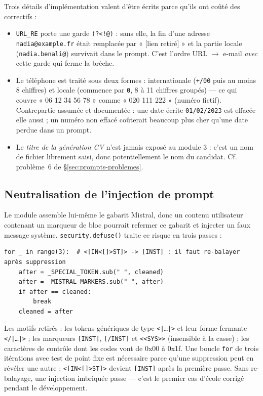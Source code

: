 Trois détails d'implémentation valent d'être écrits parce qu'ils ont coûté des
correctifs :

\begin{itemize}[itemsep=2pt]
  \item \texttt{URL\_RE} porte une garde \texttt{(?<!@)} : sans elle, la fin
        d'une adresse \texttt{nadia@example.fr} était remplacée par « [lien
        retiré] » et la partie locale (\texttt{nadia.benali@}) survivait dans le
        prompt. C'est l'ordre URL $\to$ e-mail \emph{avec} cette garde qui ferme
        la brèche.
  \item Le téléphone est traité sous deux formes : internationale
        (\texttt{+/00} puis au moins 8 chiffres) et locale (commence par
        \texttt{0}, 8 à 11 chiffres groupés) --- ce qui couvre « 06 12 34 56 78 »
        comme « 020 111 222 » (numéro fictif). Contrepartie assumée et documentée
        : une date
        écrite \texttt{01/02/2023} est effacée elle aussi ; un numéro non effacé
        coûterait beaucoup plus cher qu'une date perdue dans un prompt.
  \item Le \emph{titre de la génération CV} n'est jamais exposé au module 3 :
        c'est un nom de fichier librement saisi, donc potentiellement le nom du
        candidat. Cf. problème~6 de §\ref{sec:prompts-problemes}.
\end{itemize}

\subsection{Neutralisation de l'injection de prompt}
\label{sec:sec-inject}

Le module assemble lui-même le gabarit Mistral, donc un contenu utilisateur
contenant un marqueur de bloc pourrait refermer ce gabarit et injecter un faux
message système. \texttt{security.defuse()} traite ce risque en trois passes :

\begin{lstlisting}[style=adamcode, caption={\texttt{security.defuse()} --- trois passes de re-balayage, pas une seule.}]
for _ in range(3):  # <[IN<[]>ST]> -> [INST] : il faut re-balayer après suppression
    after = _SPECIAL_TOKEN.sub(" ", cleaned)
    after = _MISTRAL_MARKERS.sub(" ", after)
    if after == cleaned:
        break
    cleaned = after
\end{lstlisting}

Les motifs retirés : les tokens génériques de type \verb+<|…|>+ et leur forme
fermante \verb+</|…|>+ ; les marqueurs \texttt{[INST]}, \texttt{[/INST]} et
\verb+<<SYS>>+ (insensible à la casse) ; les caractères de contrôle dont les
codes vont de 0x00 à 0x1f. Une boucle \texttt{for} de trois itérations avec test de
point fixe est nécessaire parce qu'une suppression peut en révéler une autre :
\texttt{<[IN<[]>ST]>} devient \texttt{[INST]} après la première passe. Sans
re-balayage, une injection imbriquée passe --- c'est le premier cas d'école
corrigé pendant le développement.

